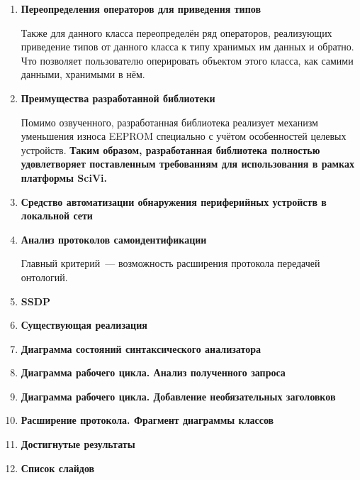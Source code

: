 \documentclass[14pt]{extarticle}
\begin{document}
\begin{enumerate}
	\item \textbf{Переопределения операторов для приведения типов}

	Также для данного класса переопределён ряд операторов, реализующих приведение типов от данного класса к типу хранимых им данных и обратно.
	Что позволяет пользователю оперировать объектом этого класса, как самими данными, хранимыми в нём.

	\item \textbf{Преимущества разработанной библиотеки}

	Помимо озвученного, разработанная библиотека реализует механизм уменьшения износа EEPROM специально с учётом особенностей целевых устройств.
	\textbf{Таким образом, разработанная библиотека полностью удовлетворяет поставленным требованиям для использования в рамках платформы SciVi.}

	\item \textbf{Средство автоматизации обнаружения периферийных устройств в локальной сети}

	\item \textbf{Анализ протоколов самоидентификации}

	Главный критерий~--- возможность расширения протокола передачей онтологий.

	\item \textbf{SSDP}

	\item \textbf{Существующая реализация}

	\item \textbf{Диаграмма состояний синтаксического анализатора}

	\item \textbf{Диаграмма рабочего цикла. Анализ полученного запроса}

	\item \textbf{Диаграмма рабочего цикла. Добавление необязательных заголовков}

	\item \textbf{Расширение протокола. Фрагмент диаграммы классов}

	\item \textbf{Достигнутые результаты}

	\item \textbf{Список слайдов}
\end{enumerate}
\end{document}
